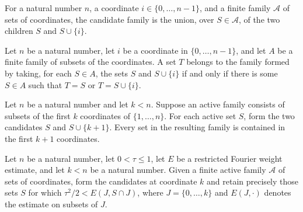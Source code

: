 \begin{definition}
\label{FABL.goldreichLevinCandidates}
\leanok
{}
For a natural number $n$, a coordinate $i\in\{0,\ldots,n-1\}$, and a finite family
$\mathcal A$ of sets of coordinates, the candidate family is the union, over
$S\in\mathcal A$, of the two children $S$ and $S\cup\{i\}$.
\end{definition}

\begin{theorem}
\label{FABL.mem_goldreichLevinCandidates_iff}
\leanok
{}
Let $n$ be a natural number, let $i$ be a coordinate in $\{0,\ldots,n-1\}$, and let
$A$ be a finite family of subsets of the coordinates. A set $T$ belongs to the family
formed by taking, for each $S\in A$, the sets $S$ and $S\cup\{i\}$ if and only if
there is some $S\in A$ such that $T=S$ or $T=S\cup\{i\}$.
\end{theorem}

\begin{theorem}
\label{FABL.goldreichLevinCandidates_subset_prefixCoordinates_succ}
\leanok
{}
Let $n$ be a natural number and let $k<n$. Suppose an active family consists of subsets
of the first $k$ coordinates of $\{1,\ldots,n\}$. For each active set $S$, form the two
candidates $S$ and $S\cup\{k+1\}$. Every set in the resulting family is contained in the
first $k+1$ coordinates.
\end{theorem}

\begin{definition}
\label{FABL.goldreichLevinRetained}
\leanok
{}
Let $n$ be a natural number, let $0<\tau\le 1$, let $E$ be a restricted Fourier weight
estimate, and let $k<n$ be a natural number. Given a finite active family $\mathcal A$
of sets of coordinates, form the candidates at coordinate $k$ and retain precisely those
sets $S$ for which $\tau^2/2<E(J,S\cap J)$, where $J=\{0,\ldots,k\}$ and $E(J,\cdot)$
denotes the estimate on subsets of $J$.
\end{definition}

